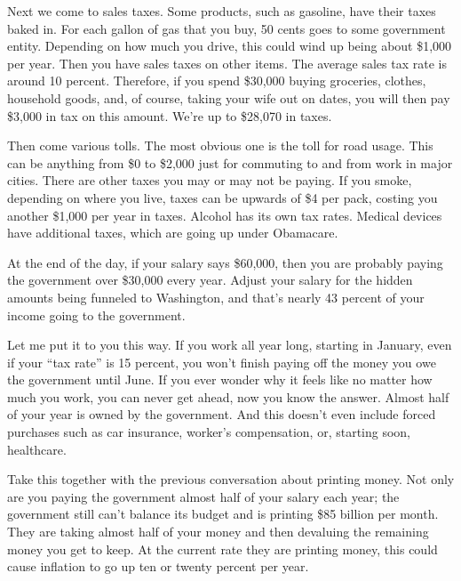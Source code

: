 \documentclass[letterpaper]{article}
\begin{document}
{\color{black}
Next we come to sales taxes. Some products, such as gasoline, have their
taxes baked in. For each gallon of gas that you buy, 50 cents goes to
some government entity. Depending on how much you drive, this could
wind up being about \$1,000 per year. Then you have sales taxes on
other items. The average sales tax rate is around 10 percent.
Therefore, \textcolor[rgb]{0.32941177,0.5529412,0.83137256}{if} you
spend \$30,000 buying groceries, clothes, household goods, and, of
course, taking your wife out on
dates\textcolor[rgb]{0.32941177,0.5529412,0.83137256}{, y}ou will then
pay \$3,000 in tax on this amount.
\textcolor[rgb]{0.32941177,0.5529412,0.83137256}{We’re up to }\$28,070
in taxes. }

{\color{black}
Then \textcolor[rgb]{0.32941177,0.5529412,0.83137256}{come} various
tolls. The most obvious one is the toll for road usage. This can be
anything from \$0 to \$2,000 just for commuting to and from work in
major cities.  There are other taxes you may or may not be paying. If
you smoke, depending on where you live, taxes can be upwards of \$4 per
pack, costing you another \$1,000 per year in taxes. Alcohol has its
own tax rates. Medical devices have additional taxes, which are going
up under Obamacare.}

{\color{black}
At the end of the day, if your salary says \$60,000, then you are
probably paying the government over \$30,000 every year. Adjust your
salary for the hidden amounts being funneled to Washington, and that’s
nearly 43 percent of your income going to the government.}

{\color{black}
Let me put it to you this way. If you work all year long, starting in
January, even if your “tax rate” is 15 percent, you won’t finish paying
off the money you owe the government until June. If you ever wonder why
it feels like no matter how much you work, you can never get ahead, now
you know the answer. Almost half of your year is owned by the
government. And this doesn’t even include forced purchases such as car
insurance, worker’s compensation, or, starting soon, healthcare.}

{\color{black}
Take this together with the previous conversation about printing money.
Not only are you paying the government almost half of your salary each
year; the government still can’t balance its budget and is printing
\$85 billion per month. They are taking almost half of your money and
then devaluing the remaining money you get to keep. At the current rate
they are printing money, this could cause inflation to go up ten or
twenty percent per year. }
\end{document}
